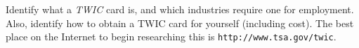 

Identify what a {\it TWIC} card is, and which industries require one for employment.  Also, identify how to obtain a TWIC card for yourself (including cost).  The best place on the Internet to begin researching this is {\tt http://www.tsa.gov/twic}.

\vskip 50pt


















